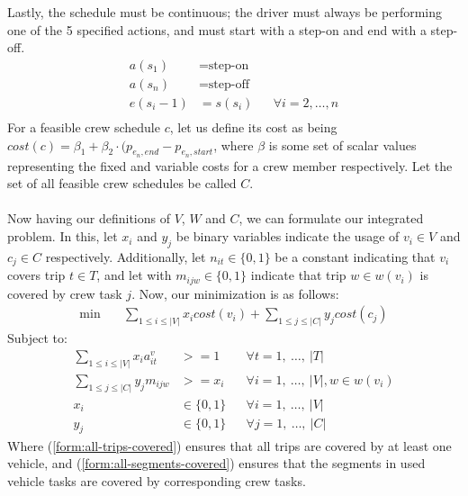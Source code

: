 \documentclass[]{article}
\begin{document}
Lastly, the schedule must be continuous; the driver must always be performing one of the 5 specified actions, and must start with a step-on and end with a step-off.
\begin{align}
  a(s_1) &= \text{step-on} && \\
  a(s_n) &= \text{step-off} && \\
  e(s_i-1) &= s(s_i) && \forall i = 2, \dots, n \\
\end{align}
For a feasible crew schedule $c$, let us define its cost as being $cost(c) = \beta_1 + \beta_2 \cdot (p_{e_n,end} - p_{e_n,start}$, where $\beta$ is some set of scalar values representing the fixed and variable costs for a crew member respectively. Let the set of all feasible crew schedules be called $C$. \\\\
Now having our definitions of $V$, $W$ and $C$, we can formulate our integrated problem. In this, let $x_i$ and $y_j$ be binary variables indicate the usage of $v_i \in V$ and $c_j \in C$ respectively. Additionally, let $n_{it} \in \{ 0, 1 \}$ be a constant indicating that $v_i$ covers trip $t \in T$, and let with $m_{ijw} \in \{ 0, 1 \} $ indicate that trip $w \in w(v_i)$ is covered by crew task $j$. Now, our minimization is as follows:
\begin{align}
\min \quad
& \sum_{1 \leq i \leq |V|} x_{i}cost(v_i) + \sum_{1 \leq j \leq |C|} y_{j}cost(c_j)  
\end{align}
Subject to:
\begin{align}
\sum_{1 \leq i \leq |V|} x_{i}a^v_{it} &>= 1 && \forall t = 1,\:\dots,\:|T| \label{form:all-trips-covered} \\
\sum_{1 \leq j \leq |C|} y_{j}m_{ijw} &>= x_{i} && \forall i = 1,\:\dots,\:|V|, w \in w(v_i) \label{form:all-segments-covered} \\
x_{i} &\in \{ 0, 1 \} && \forall i = 1,\:\dots,\:|V| \\
y_{j} &\in \{ 0, 1 \} && \forall j = 1,\:\dots,\:|C|
\end{align}
Where (\ref{form:all-trips-covered}) ensures that all trips are covered by at least one vehicle, and (\ref{form:all-segments-covered}) ensures that the segments in used vehicle tasks are covered by corresponding crew tasks.
\end{document}
